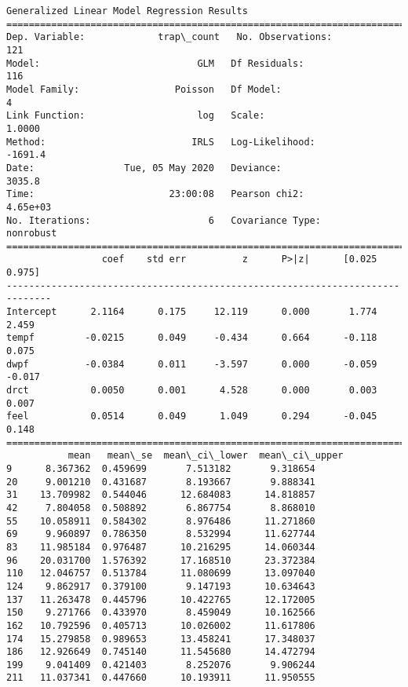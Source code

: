 \documentclass[11pt]{article}
\begin{document}
    \begin{Verbatim}[commandchars=\\\{\}]
                 Generalized Linear Model Regression Results                  
==============================================================================
Dep. Variable:             trap\_count   No. Observations:                  121
Model:                            GLM   Df Residuals:                      116
Model Family:                 Poisson   Df Model:                            4
Link Function:                    log   Scale:                          1.0000
Method:                          IRLS   Log-Likelihood:                -1691.4
Date:                Tue, 05 May 2020   Deviance:                       3035.8
Time:                        23:00:08   Pearson chi2:                 4.65e+03
No. Iterations:                     6   Covariance Type:             nonrobust
==============================================================================
                 coef    std err          z      P>|z|      [0.025      0.975]
------------------------------------------------------------------------------
Intercept      2.1164      0.175     12.119      0.000       1.774       2.459
tempf         -0.0215      0.049     -0.434      0.664      -0.118       0.075
dwpf          -0.0384      0.011     -3.597      0.000      -0.059      -0.017
drct           0.0050      0.001      4.528      0.000       0.003       0.007
feel           0.0514      0.049      1.049      0.294      -0.045       0.148
==============================================================================
           mean   mean\_se  mean\_ci\_lower  mean\_ci\_upper
9      8.367362  0.459699       7.513182       9.318654
20     9.001210  0.431687       8.193667       9.888341
31    13.709982  0.544046      12.684083      14.818857
42     7.804058  0.508892       6.867754       8.868010
55    10.058911  0.584302       8.976486      11.271860
69     9.960897  0.786350       8.532994      11.627744
83    11.985184  0.976487      10.216295      14.060344
96    20.031700  1.576392      17.168510      23.372384
110   12.046757  0.513784      11.080699      13.097040
124    9.862917  0.379100       9.147193      10.634643
137   11.263478  0.445796      10.422765      12.172005
150    9.271766  0.433970       8.459049      10.162566
162   10.792596  0.405713      10.026002      11.617806
174   15.279858  0.989653      13.458241      17.348037
186   12.926649  0.745140      11.545680      14.472794
199    9.041409  0.421403       8.252076       9.906244
211   11.037341  0.447660      10.193911      11.950555

\end{Verbatim}
\end{document}
